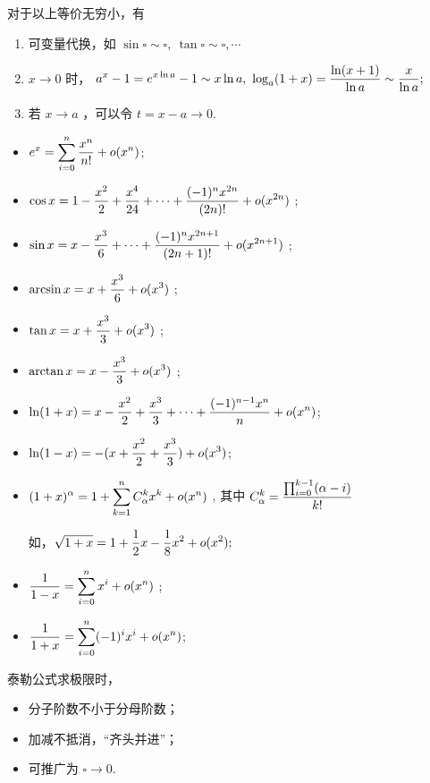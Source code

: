 对于以上等价无穷小，有

\begin{enumerate}
    \item 可变量代换，如 $ \sin \square \sim \square,\ \tan \square \sim \square,\cdots $ 
    \item $ x\rightarrow0 $ 时，
    $\dis a^x-1=e^{x\ln a} -1\sim x\ln a,\ \log_a(1+x)=\frac{\ln(x+1)}{\ln a}\sim \frac{x}{\ln a};$
    \item 若 $ x\rightarrow a $ ，可以令 $ t = x - a \rightarrow 0. $ 
\end{enumerate}


\begin{itemize}
    \item $\displaystyle e^x = \sum_{i=0}^n \dfrac{x^n}{n!}+ o(x^n)$;
    \item $\displaystyle \cos x = 1 - \frac{x^2}{2} + \dfrac{x^4}{24} +\dots + \frac{(-1)^{n}x^{2n}}{(2n)!} + o(x^{2n})$ ;
    \item $\displaystyle \sin x = x - \frac{x^3}{6} + \dots + \frac{(-1)^{n}x^{2n+1}}{(2n+1)!} + o(x^{2n+1}) $ ;
    \item $\displaystyle \arcsin x = x + \frac{x^3}{6} +o(x^3)$ ;
    \item $\displaystyle \tan x = x + \frac{x^3}{3} + o(x^3)$ ;
    \item $\displaystyle \arctan x = x - \frac{x^3}{3} + o(x^3)$ ;
    \item $\displaystyle \ln (1+x) = x - \frac{x^2}{2} + \frac{x^3}{3} + \dots + \frac{(-1)^{n-1}x^n}{n} + o(x^n) $;
    \item $\displaystyle \ln(1-x) = -(x+\frac{x^2}{2} + \frac{x^3}{3}) + o(x^3)$;
    \item $\displaystyle (1+x)^\alpha = 1+\sum_{k=1}^n C_\alpha^kx^k + o(x^n) $ ,
    其中 $\displaystyle C_\alpha^k=\frac{\prod_{i = 0}^{k-1}(\alpha - i)}{k!} $ 

    如，$ \displaystyle \sqrt{1+x} = 1 + \dfrac{1}{2}x - \dfrac{1}{8}x^2 + o(x^2); $ 
    \item $\displaystyle \frac{1}{1-x} = \sum_{i=0}^n x^i + o(x^n) $ ;
    \item $\displaystyle \frac{1}{1+x} = \sum_{i=0}^n (-1)^i x^i + o(x^n) $;
\end{itemize}

泰勒公式求极限时，\begin{itemize}
    \item 分子阶数不小于分母阶数；
    \item 加减不抵消，“齐头并进”；
    \item 可推广为 $ \square\rightarrow 0. $
\end{itemize}

